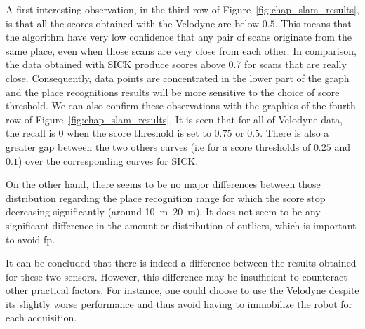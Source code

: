 A first interesting observation, in the third row of Figure~\ref{fig:chap_slam_results}, is that all the scores obtained with the Velodyne are below $0.5$. This means that the algorithm have very low confidence that any pair of scans originate from the same place, even when those scans are very close from each other. In comparison, the data obtained with SICK produce scores above 0.7 for scans that are really close. Consequently, data points are concentrated in the lower part of the graph and the place recognitions results will be more sensitive to the choice of score threshold. We can also confirm these observations with the graphics of the fourth row of Figure~\ref{fig:chap_slam_results}. It is seen that for all of Velodyne data, the recall is 0 when the score threshold is set to $0.75$ or $0.5$. There is also a greater gap between the two others curves (i.e for a score thresholds of $0.25$ and $0.1$) over the corresponding curves for SICK.

On the other hand, there seems to be no major differences between those distribution regarding the place recognition range for which the score stop decreasing significantly (around \SIrange{10}{20}{\meter}). It does not seem to be any significant difference in the amount or distribution of outliers, which is important to avoid \gls*{fp}.

It can be concluded that there is indeed a difference between the results obtained for these two sensors. However, this difference may be insufficient to counteract other practical factors. For instance, one could choose to use the Velodyne despite its slightly worse performance and thus avoid having to immobilize the robot for each acquisition.

